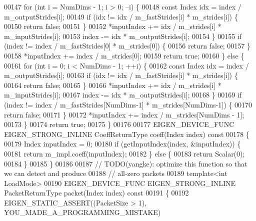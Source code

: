 \begin{DoxyCode}
00147       \textcolor{keywordflow}{for} (\textcolor{keywordtype}{int} i = NumDims - 1; i > 0; --i) \{
00148         \textcolor{keyword}{const} Index idx = index / m\_outputStrides[i];
00149         \textcolor{keywordflow}{if} (idx != idx / m\_fastStrides[i] * m\_strides[i]) \{
00150           \textcolor{keywordflow}{return} \textcolor{keyword}{false};
00151         \}
00152         *inputIndex += idx / m\_strides[i] * m\_inputStrides[i];
00153         index -= idx * m\_outputStrides[i];
00154       \}
00155       \textcolor{keywordflow}{if} (index != index / m\_fastStrides[0] * m\_strides[0]) \{
00156         \textcolor{keywordflow}{return} \textcolor{keyword}{false};
00157       \}
00158       *inputIndex += index / m\_strides[0];
00159       \textcolor{keywordflow}{return} \textcolor{keyword}{true};
00160     \} \textcolor{keywordflow}{else} \{
00161       \textcolor{keywordflow}{for} (\textcolor{keywordtype}{int} i = 0; i < NumDims - 1; ++i) \{
00162         \textcolor{keyword}{const} Index idx = index / m\_outputStrides[i];
00163         \textcolor{keywordflow}{if} (idx != idx / m\_fastStrides[i] * m\_strides[i]) \{
00164           \textcolor{keywordflow}{return} \textcolor{keyword}{false};
00165         \}
00166         *inputIndex += idx / m\_strides[i] * m\_inputStrides[i];
00167         index -= idx * m\_outputStrides[i];
00168       \}
00169       \textcolor{keywordflow}{if} (index != index / m\_fastStrides[NumDims-1] * m\_strides[NumDims-1]) \{
00170         \textcolor{keywordflow}{return} \textcolor{keyword}{false};
00171       \}
00172       *inputIndex += index / m\_strides[NumDims - 1];
00173     \}
00174     \textcolor{keywordflow}{return} \textcolor{keyword}{true};
00175   \}
00176 
00177   EIGEN\_DEVICE\_FUNC EIGEN\_STRONG\_INLINE CoeffReturnType coeff(Index index)\textcolor{keyword}{ const}
00178 \textcolor{keyword}{  }\{
00179     Index inputIndex = 0;
00180     \textcolor{keywordflow}{if} (getInputIndex(index, &inputIndex)) \{
00181      \textcolor{keywordflow}{return} m\_impl.coeff(inputIndex);
00182     \} \textcolor{keywordflow}{else} \{
00183      \textcolor{keywordflow}{return} Scalar(0);
00184     \}
00185   \}
00186 
00187   \textcolor{comment}{// TODO(yangke): optimize this function so that we can detect and produce}
00188   \textcolor{comment}{// all-zero packets}
00189   \textcolor{keyword}{template}<\textcolor{keywordtype}{int} LoadMode>
00190   EIGEN\_DEVICE\_FUNC EIGEN\_STRONG\_INLINE PacketReturnType packet(Index index)\textcolor{keyword}{ const}
00191 \textcolor{keyword}{  }\{
00192     EIGEN\_STATIC\_ASSERT((PacketSize > 1), YOU\_MADE\_A\_PROGRAMMING\_MISTAKE)

\end{DoxyCode}
